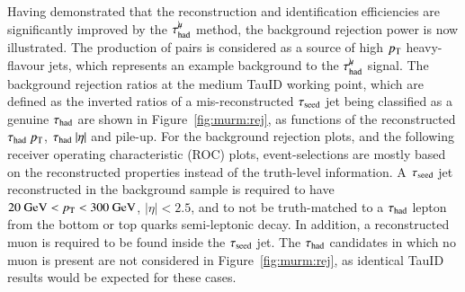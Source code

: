         Having demonstrated that the reconstruction and identification efficiencies are significantly improved by the $\tau_\mathrm{had}^{\mu\mkern-10mu\backslash}$ method, 
        the background rejection power is now illustrated. The production of \ttbar pairs is considered as a source of 
        high $p_{\text{T}}$ heavy-flavour jets, which represents an example background to the $\tau_\mathrm{had}^{\mu\mkern-10mu\backslash}$ signal.
        The background rejection ratios at the medium TauID working point, which are defined as the 
        inverted ratios of a mis-reconstructed $\tau_\mathrm{seed}$ jet being classified as a genuine $\tau_{\text{had}}$ are shown in Figure~\ref{fig:murm:rej},
        as functions of the reconstructed $\tau_{\text{had}}~p_{\text{T}}$, $\tau_{\text{had}}~|\eta|$ and pile-up. For the background rejection plots, and the following 
        receiver operating characteristic (ROC) plots, event-selections are mostly based on the reconstructed properties instead of the truth-level 
        information. A $\tau_\mathrm{seed}$ jet reconstructed in the background sample is required to have 
        $20\text{ \ensuremath{\text{GeV}}}<p_{\text{T}}<300\text{ \ensuremath{\text{GeV}}}$, 
        $|\eta|<2.5$, 
        and to not be truth-matched to a $\tau_{\text{had}}$ lepton from the bottom or top quarks semi-leptonic decay. 
        In addition, a reconstructed muon is required to be found inside the $\tau_\mathrm{seed}$ jet. 
        The $\tau_{\text{had}}$ candidates in which no muon is present are not considered in Figure~\ref{fig:murm:rej}, as identical 
        TauID results would be expected for these cases.

